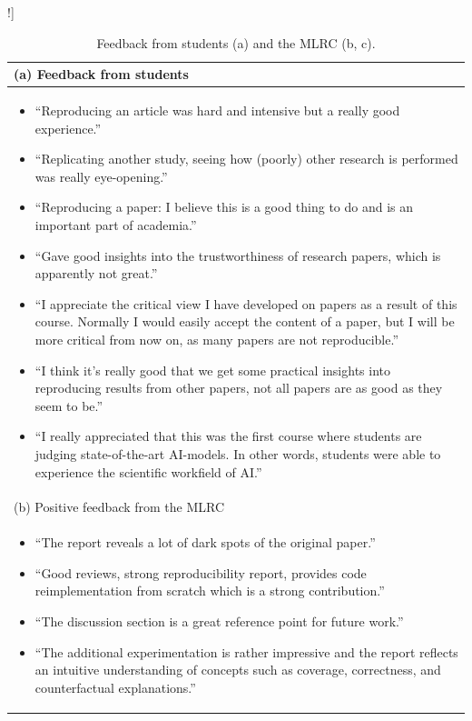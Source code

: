 \documentclass[letterpaper]{article}
\begin{document}
\begin{table}[htb]!]
\caption{Feedback from students (a) and the MLRC (b, c).}
\centering
\begin{tabular}{@{}l@{}}
\toprule
(a) Feedback from students \\
\midrule
\begin{minipage}[t]{\columnwidth}
\begin{itemize}[leftmargin=*]
    \item ``Reproducing an article was hard and intensive but a really good experience.''
     \item ``Replicating another study, seeing how (poorly) other research is performed was really eye-opening.''
    \item ``Reproducing a paper: I believe this is a good thing to do and is an important part of academia.''
    \item  ``Gave good insights into the trustworthiness of research papers, which is apparently not great.''
    \item ``I appreciate the critical view I have developed on papers as a result of this course. Normally I would easily accept the content of a paper, but I will be more critical from now on, as many papers are not reproducible.''
    \item ``I think it's really good that we get some practical insights into reproducing results from other papers, not all papers are as good as they seem to be.''
    \item ``I really appreciated that this was the first course where students are judging state-of-the-art AI-models. In other words, students were able to experience the scientific workfield of AI.''
\end{itemize}
\end{minipage}
\\
\midrule
(b) Positive feedback from the MLRC \\
\midrule
\begin{minipage}[t]{\columnwidth}
\begin{itemize}[leftmargin=*]
\item ``The report reveals a lot of dark spots of the original paper.''
\item ``Good reviews, strong reproducibility report, provides code reimplementation from scratch which is a strong contribution.''
\item ``The discussion section is a great reference point for future work.''
\item ``The additional experimentation is rather impressive and the report reflects  an intuitive understanding of concepts such as  coverage, correctness, and counterfactual explanations.''

\end{itemize}
\end{minipage}
\end{tabular}
\end{table}
\end{document}
